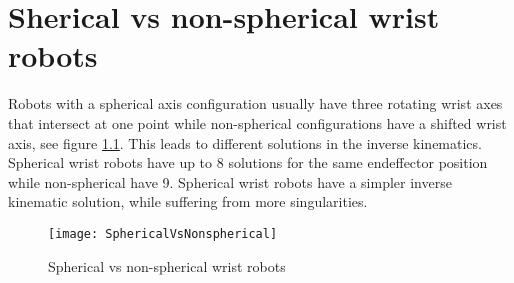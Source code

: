 \chapter{Sherical vs non-spherical wrist robots}

Robots with a spherical axis configuration usually have three rotating wrist axes that intersect at one point while non-spherical configurations have a shifted wrist axis, see figure \ref{fig:SphericalVsNonspherical}.
This leads to different solutions in the inverse kinematics. Spherical wrist robots have up to 8 solutions for the same endeffector position while non-spherical have 9.
Spherical wrist robots have a simpler inverse kinematic solution, while suffering from more singularities. \cite{SphericalNonspherical}



\begin{figure}[H]
	\texttt{[image: SphericalVsNonspherical]}
	\caption{Spherical vs non-spherical wrist robots \cite{SphericalNonspherical}}
	\label{fig:SphericalVsNonspherical}
\end{figure}